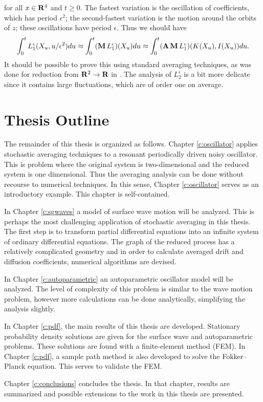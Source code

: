 for all $x \in \mathbf R^4$ and $t \ge 0$. The fastest variation is the oscillation of coefficients, which has period $\epsilon^2$; the second-fastest variation is the motion around the orbits of $z$; these oscillations have period $\epsilon$. Thus we should have
\[
\int_0^t L^\epsilon_1(X_u,u/\epsilon^2)du \approx \int_0^t (\operatorname{\mathbf M} L^\epsilon_1)(X_u)du \approx \int_0^t(\operatorname{\mathbf A} \operatorname{\mathbf M} L^\epsilon_1)(K(X_u),I(X_u)) du.
\]
It should be possible to prove this using standard averaging techniques, as was done for reduction from $\mathbf R^2 \to \mathbf R$ in \citet{namachchivaya01:_unified_approac_noisy_nonlin_mathieu_type_system}.
The analysis of $L^\epsilon_2$ is a bit more delicate since it contains large fluctuations, which are of order one on average.

\section{Thesis Outline}

The remainder of this thesis is organized as follows. Chapter \ref{c:oscillator} applies stochastic averaging techniques to a resonant periodically driven noisy oscillator. This is problem where the original system is two-dimensional and the reduced system is one dimensional. Thus the averaging analysis can be done without recourse to numerical techniques. In this sense, Chapter \ref{c:oscillator} serves as an introductory example. This chapter is self-contained.

In Chapter \ref{c:sgwaves} a model of surface wave motion will be analyzed. This is perhaps the most challenging application of stochastic averaging in this thesis. The first step is to transform partial differential equations into an infinite system of ordinary differential equations. The graph of the reduced process has a relatively complicated geometry and in order to calculate averaged drift and diffusion coefficients, numerical algorithms are devised.

In Chapter \ref{c:autoparametric} an autoparametric oscillator model will be analyzed. The level of complexity of this problem is similar to the wave motion problem, however more calculations can be done analytically, simplifying the analysis slightly.

In Chapter \ref{c:pdf}, the main results of this thesis are developed. Stationary probability density solutions are given for the surface wave and autoparametric problems. These solutions are found with a finite-element method (FEM). In Chapter \ref{c:pdf}, a sample path method is also developed to solve the Fokker--Planck equation. This serves to validate the FEM.

Chapter \ref{c:conclusions} concludes the thesis. In that chapter, results are summarized and possible extensions to the work in this thesis are presented.


